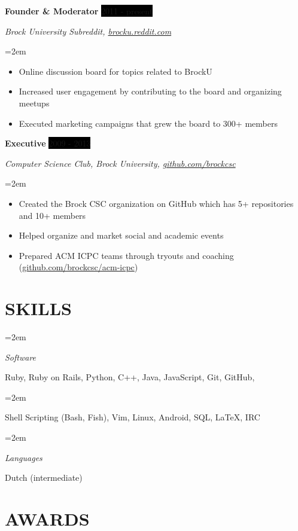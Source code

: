 \documentclass[paper=a4,fontsize=11pt]{scrartcl} %
\newlength{\spacebox}
\newcommand{\sepspace}{\vspace*{1em}}   %
\newcommand{\NewPart}[1]{\section*{\uppercase{#1}}}
\newcommand{\PersonalEntry}[2]{
    \noindent\hangindent=2em\hangafter=0 %
    \parbox{\spacebox}{                  %
    \textit{#1}}                      %
    \hspace{1.5em} #2 \par}              %
\newcommand{\SkillsEntry}[2]{                %
    \noindent\hangindent=2em\hangafter=0 %
    \parbox{\spacebox}{                  %
    \textit{#1}}                    %
    \hspace{1.5em} #2 \par}              %
\newcommand{\EducationEntry}[4]{
    \noindent \textbf{#1} \hfill      %
    \colorbox{Black}{
      \parbox{8.5em}{
      \hfill\color{White}#2}} \par  %
    \noindent \textit{#3} \par        %
    \noindent\hangindent=2em\hangafter=0 \small #4 %
    \normalsize \par}
\newcommand{\OrganizationEntry}[4]{         %
    \noindent \textbf{#1} \hfill            %
    \colorbox{Black}{\color{White}#2} \par  %
    \noindent \textit{#3} \par              %
    \noindent\hangindent=2em\hangafter=0 \small #4 %
    \normalsize \par}
\begin{document}
\OrganizationEntry{Founder \& Moderator}{2011 - present}
{Brock University Subreddit, \url{brocku.reddit.com}}
{
 \begin{itemize} \itemsep -1pt
   \item Online discussion board for topics related to BrockU
   \item Increased user engagement by contributing to the board and organizing meetups
   \item Executed marketing campaigns that grew the board to 300+ members
 \end{itemize}
}
\sepspace

\OrganizationEntry{Executive}{2009 - 2013}
{Computer Science Club, Brock University, \url{github.com/brockcsc}}
{
 \begin{itemize} \itemsep -1pt
   \item Created the Brock CSC organization on GitHub which has 5+ repositories and 10+ members
   \item Helped organize and market social and academic events
   \item Prepared ACM ICPC teams through tryouts and coaching (\url{github.com/brockcsc/acm-icpc})
 \end{itemize}
}


\NewPart{Skills}{}

\SkillsEntry{Software}{Ruby, Ruby on Rails, Python, C++, Java, JavaScript, Git, GitHub,}
\SkillsEntry{}{Shell Scripting (Bash, Fish), Vim, Linux, Android, SQL, \LaTeX, IRC}
\sepspace
\SkillsEntry{Languages}{Dutch (intermediate)}

\NewPart{Awards}{}
\end{document}
